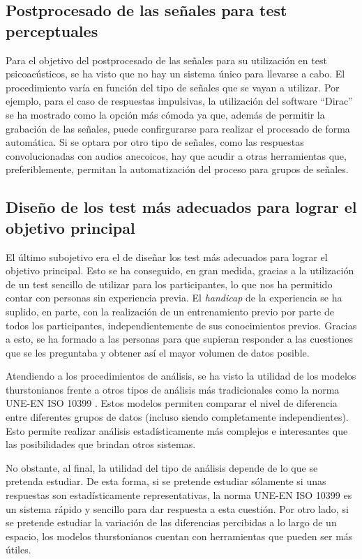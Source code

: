 \documentclass[11pt,a4paper,twoside]{book}
\begin{document}
        \subsection*{Postprocesado de las señales para test perceptuales}
            Para el objetivo del postprocesado de las señales para su utilización en test psicoacústicos, se ha visto que no hay un sistema único para llevarse a cabo. El procedimiento varía en función del tipo de señales que se vayan a utilizar. Por ejemplo, para el caso de respuestas impulsivas, la utilización del software ``Dirac'' se ha mostrado como la opción más cómoda ya que, además de permitir la grabación de las señales, puede confirgurarse para realizar el procesado de forma automática. Si se optara por otro tipo de señales, como las respuestas convolucionadas con audios anecoicos, hay que acudir a otras herramientas que, preferiblemente, permitan la automatización del proceso para grupos de señales.
        
        \subsection*{Diseño de los test más adecuados para lograr el objetivo principal}
            El último subojetivo era el de diseñar los test más adecuados para lograr el objetivo principal. Esto se ha conseguido, en gran medida, gracias a la utilización de un test sencillo de utilizar para los participantes, lo que nos ha permitido contar con personas sin experiencia previa. El \textit{handicap} de la experiencia se ha suplido, en parte, con la realización de un entrenamiento previo por parte de todos los participantes, independientemente de sus conocimientos previos. Gracias a esto, se ha formado a las personas para que supieran responder a las cuestiones que se les preguntaba y obtener así el mayor volumen de datos posible. 
    
            Atendiendo a los procedimientos de análisis, se ha visto la utilidad de los modelos thurstonianos frente a otros tipos de análisis más tradicionales como la norma UNE-EN ISO 10399 \cite{ISO10399}. Estos modelos permiten comparar el nivel de diferencia entre diferentes grupos de datos (incluso siendo completamente independientes). Esto permite realizar análisis estadísticamente más complejos e interesantes que las posibilidades que brindan otros sistemas. 
    
            No obstante, al final, la utilidad del tipo de análisis depende de lo que se pretenda estudiar. De esta forma, si se pretende estudiar sólamente si unas respuestas son estadísticamente representativas, la norma UNE-EN ISO 10399 es un sistema rápido y sencillo para dar respuesta a esta cuestión. Por otro lado, si se pretende estudiar la variación de las diferencias percibidas a lo largo de un espacio, los modelos thurstonianos cuentan con herramientas que pueden ser más útiles. 
    
\end{document}
